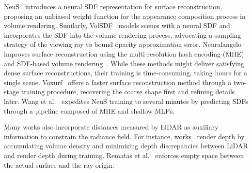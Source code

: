 NeuS~\cite{wang2021neus} introduces a neural SDF representation for surface reconstruction, proposing an unbiased weight function for the appearance composition process in volume rendering. Similarly, VolSDF~\cite{yariv2021volume} models scenes with a neural SDF and incorporates the SDF into the volume rendering process, advocating a sampling strategy of the viewing ray to bound opacity approximation error. Neuralangelo~\cite{li2023neuralangelo} improves surface reconstruction using the multi-resolution hash encoding (MHE)~\cite{mueller2022instant} and SDF-based volume rendering~\cite{wang2021neus}. While these methods might deliver satisfying dense surface reconstructions, their training is time-consuming, taking hours for a single scene.
Voxurf~\cite{wu2022voxurf} offers a faster surface reconstruction method through a two-stage training procedure, recovering the coarse shape first and refining details later. Wang et al.~\cite{wang2023neus2} expedites NeuS training to several minutes by predicting SDFs through a pipeline composed of MHE and shallow MLPs.

Many works also incorporate distances measured by LiDAR as auxiliary information to constrain the radiance field. For instance, works~\cite{chang2023neural, wang2023neural} render depth by accumulating volume density and minimizing depth discrepancies between LiDAR and render depth during training. Rematas et al.~\cite{rematas2022urban} enforces empty space between the actual surface and the ray origin.




